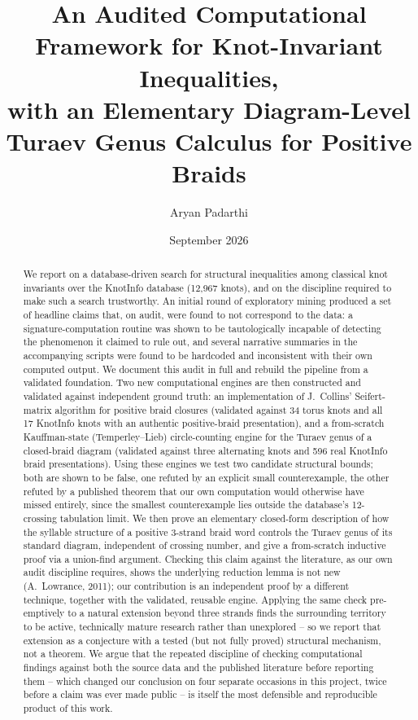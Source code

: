 \documentclass[11pt]{article}
\title{An Audited Computational Framework for Knot-Invariant Inequalities,\\
with an Elementary Diagram-Level Turaev Genus Calculus for Positive Braids}
\author{Aryan Padarthi}
\date{September 2026}
\theoremstyle{definition}
\begin{document}
\maketitle

\begin{abstract}
We report on a database-driven search for structural inequalities among classical knot invariants over the KnotInfo database (12{,}967 knots), and on the discipline required to make such a search trustworthy. An initial round of exploratory mining produced a set of headline claims that, on audit, were found to not correspond to the data: a signature-computation routine was shown to be tautologically incapable of detecting the phenomenon it claimed to rule out, and several narrative summaries in the accompanying scripts were found to be hardcoded and inconsistent with their own computed output. We document this audit in full and rebuild the pipeline from a validated foundation. Two new computational engines are then constructed and validated against independent ground truth: an implementation of J.~Collins' Seifert-matrix algorithm for positive braid closures (validated against 34 torus knots and all 17 KnotInfo knots with an authentic positive-braid presentation), and a from-scratch Kauffman-state (Temperley--Lieb) circle-counting engine for the Turaev genus of a closed-braid diagram (validated against three alternating knots and 596 real KnotInfo braid presentations). Using these engines we test two candidate structural bounds; both are shown to be false, one refuted by an explicit small counterexample, the other refuted by a published theorem that our own computation would otherwise have missed entirely, since the smallest counterexample lies outside the database's 12-crossing tabulation limit. We then prove an elementary closed-form description of how the syllable structure of a positive 3-strand braid word controls the Turaev genus of its standard diagram, independent of crossing number, and give a from-scratch inductive proof via a union-find argument. Checking this claim against the literature, as our own audit discipline requires, shows the underlying reduction lemma is not new (A.~Lowrance, 2011); our contribution is an independent proof by a different technique, together with the validated, reusable engine. Applying the same check pre-emptively to a natural extension beyond three strands finds the surrounding territory to be active, technically mature research rather than unexplored -- so we report that extension as a conjecture with a tested (but not fully proved) structural mechanism, not a theorem. We argue that the repeated discipline of checking computational findings against both the source data and the published literature before reporting them -- which changed our conclusion on four separate occasions in this project, twice before a claim was ever made public -- is itself the most defensible and reproducible product of this work.
\end{abstract}
\end{document}

